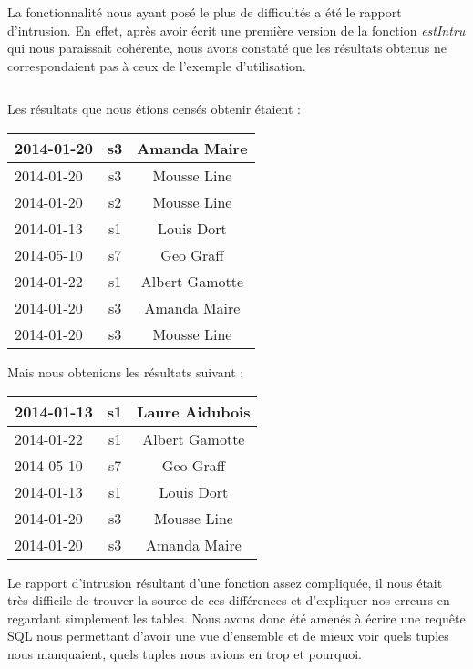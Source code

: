La fonctionnalité nous ayant posé le plus de difficultés a été le rapport d'intrusion. En effet, après avoir écrit une première version de la fonction \textit{estIntru} qui nous paraissait cohérente, nous avons constaté que les résultats obtenus ne correspondaient pas à ceux de l'exemple d'utilisation. \\

\inputminted[tabsize=4,linenos,fontsize=\small]{sql}{code/1.sql}

Les résultats que nous étions censés obtenir étaient :
\begin{center}
	\begin{tabular}
		{| l |	c |	c |} \hline
		2014-01-20 & s3 & Amanda Maire \\ \hline
		2014-01-20 & s3 & Mousse Line \\ \hline
		2014-01-20 & s2 & Mousse Line \\ \hline
		2014-01-13 & s1 & Louis Dort \\ \hline
		2014-05-10 & s7 & Geo Graff \\ \hline
		2014-01-22 & s1 & Albert Gamotte \\ \hline
		2014-01-20 & s3 & Amanda Maire \\ \hline
		2014-01-20 & s3 & Mousse Line \\ \hline
	\end{tabular}
\end{center}

Mais nous obtenions les résultats suivant :
\begin{center}
	\begin{tabular}
		{| l |	c |	c |} \hline
		2014-01-13 & s1 & Laure Aidubois \\ \hline
		2014-01-22 & s1 & Albert Gamotte \\ \hline
		2014-05-10 & s7 & Geo Graff \\ \hline
		2014-01-13 & s1 & Louis Dort \\ \hline
		2014-01-20 & s3 & Mousse Line \\ \hline
		2014-01-20 & s3 & Amanda Maire \\ \hline
	\end{tabular}
\end{center}



Le rapport d'intrusion résultant d'une fonction assez compliquée, il nous était très difficile de trouver la source de ces différences et d'expliquer nos erreurs en regardant simplement les tables. Nous avons donc été amenés à écrire une requête SQL nous permettant d'avoir une vue d'ensemble et de mieux voir quels tuples nous manquaient, quels tuples nous avions en trop et pourquoi.\\

